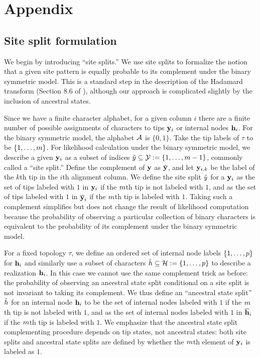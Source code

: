 \section*{Appendix}

\subsection*{Site split formulation}
We begin by introducing ``site splits.''
We use site splits to formalize the notion that a given site pattern is equally probable to its complement under the binary symmetric model.
This is a standard step in the description of the Hadamard transform (Section 8.6 of \citet{Semple2003-em}), although our approach is complicated slightly by the inclusion of ancestral states.

Since we have a finite character alphabet, for a given column $i$ there are a finite number of possible assignments of characters to tips $\mathbf{y}_i$ or internal nodes $\mathbf{h}_i$.
For the binary symmetric model, the alphabet $\mathcal{A}$ is $\{0,1\}$.
Take the tip labels of $\tau$ to be $\{1,\ldots,m\}$.
For likelihood calculation under the binary symmetric model, we describe a given $\mathbf{y}_i$ as a subset of indices $\tilde{y}\subseteq\mathcal{Y}:=\{1,\ldots,m-1\}$, commonly called a ``site split.''
Define the complement of $\mathbf{y}$ as $\overline{\mathbf{y}}$, and let $\mathbf{y}_{i,k}$ be the label of the $k$th tip in the $i$th alignment column.
We define the site split $\tilde{y}$ for a $\mathbf{y}_i$ as the set of tips labeled with $1$ in $\mathbf{y}_i$ if the $m$th tip is not labeled with $1$, and as the set of tips labeled with $1$ in $\overline{\mathbf{y}}_i$ if the $m$th tip is labeled with $1$.
Taking such a complement simplifies but does not change the result of likelihood computation because the probability of observing a particular collection of binary characters is equivalent to the probability of its complement under the binary symmetric model.

For a fixed topology $\tau$, we define an ordered set of internal node labels $\{1,\ldots,p\}$ for $\mathbf{h}_i$ and similarly use a subset of characters $\tilde{h}\subseteq\mathcal{H}:=\{1,\ldots,p\}$ to describe a realization $\mathbf{h}_i$.
In this case we cannot use the same complement trick as before: the probability of observing an ancestral state split conditional on a site split is not invariant to taking its complement.
We thus define an ``ancestral state split'' $\tilde{h}$ for an internal node $\mathbf{h}_i$ to be the set of internal nodes labeled with $1$ if the $m$th tip is not labeled with $1$, and as the set of internal nodes labeled with $1$ in $\overline{\mathbf{h}}_i$ if the $m$th tip is labeled with $1$.
We emphasize that the ancestral state split complementing procedure depends on tip states, not ancestral states: both site splits and ancestral state splits are defined by whether the $m$th element of $\mathbf{y}_i$ is labeled as $1$.

